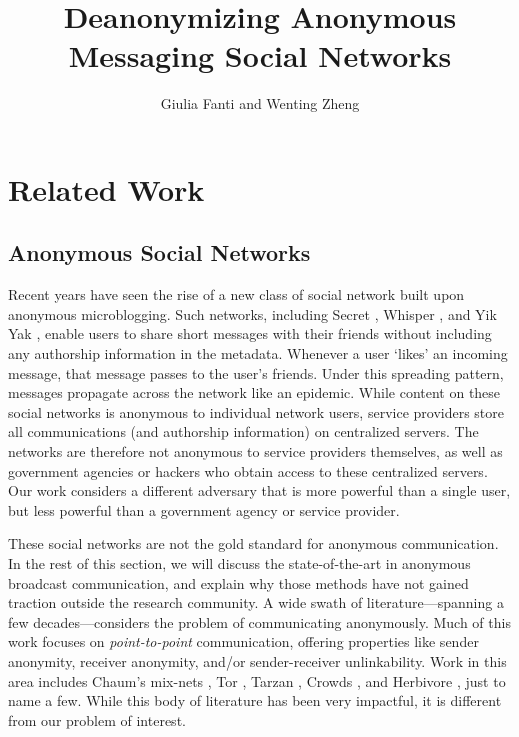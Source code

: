 \documentclass[10pt, twocolumn]{article}
\begin{document}
\title{Deanonymizing Anonymous Messaging Social Networks}

\author{Giulia Fanti and Wenting Zheng}

   \date{}
   \maketitle
   \thispagestyle{empty}
\section{Related Work}

\subsection{Anonymous Social Networks} 
Recent years have seen the rise of a new class of social network built upon anonymous microblogging.
Such networks, including Secret \cite{secret}, Whisper \cite{whisper}, and Yik Yak \cite{yikyak}, enable users to share short messages with their friends without including any authorship information in the metadata. 
Whenever a user `likes' an incoming message, that message passes to the user's friends.
Under this spreading pattern, messages propagate across the network like an epidemic.
While content on these social networks is anonymous to individual network users, service providers store all communications (and authorship information) on centralized servers.
The networks are therefore not anonymous to service providers themselves, as well as government agencies or hackers who obtain access to these centralized servers.
Our work considers a different adversary that is more powerful than a single user, but less powerful than a government agency or service provider.

These social networks are not the gold standard for anonymous communication. In the rest of this section, we will discuss the state-of-the-art in anonymous broadcast communication, and explain why those methods have not gained traction outside the research community.
A wide swath of literature---spanning a few decades---considers the problem of communicating anonymously.
Much of this work focuses on \emph{point-to-point} communication, offering properties like sender anonymity, receiver anonymity, and/or sender-receiver unlinkability. 
Work in this area includes Chaum's mix-nets \cite{chaum1981untraceable}, Tor \cite{tor}, Tarzan \cite{tarzan}, Crowds \cite{reiter1998crowds}, and Herbivore \cite{goel2003herbivore}, just to name a few.
While this body of literature has been very impactful, it is different from our problem of interest.
\end{document}
